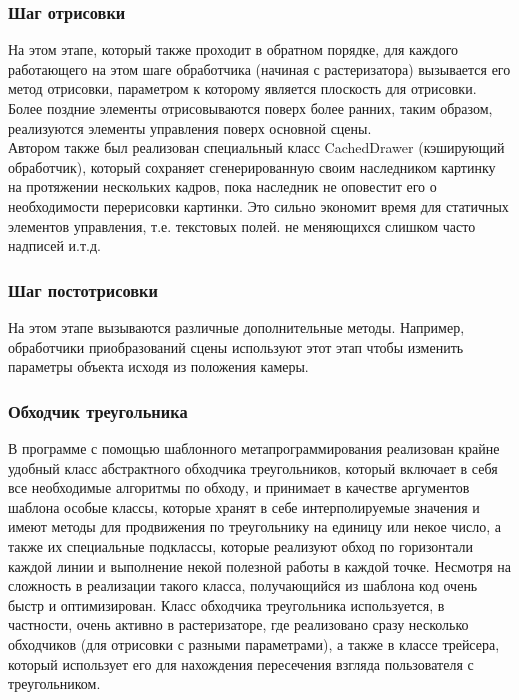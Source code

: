 \documentclass[a4paper,12pt]{report}
\numberwithin{equation}{section}
\begin{document}
\subsubsection{Шаг отрисовки}
На этом этапе, который также проходит в обратном порядке, для каждого работающего на этом шаге обработчика (начиная с растеризатора) вызывается его метод отрисовки, параметром к которому является плоскость для отрисовки. Более поздние элементы отрисовываются поверх более ранних, таким образом, реализуются элементы управления поверх основной сцены. \\
Автором также был реализован специальный класс CachedDrawer (кэширующий обработчик), который сохраняет сгенерированную своим наследником картинку на протяжении нескольких кадров, пока наследник не оповестит его о необходимости перерисовки картинки. Это сильно экономит время для статичных элементов управления, т.е. текстовых полей. не меняющихся слишком часто надписей и.т.д.

\subsubsection{Шаг постотрисовки}
На этом этапе вызываются различные дополнительные методы. Например, обработчики приобразований сцены используют этот этап чтобы изменить параметры объекта исходя из положения камеры.

\subsubsection{Обходчик треугольника} \label{triangle_traverse_struct_section}
В программе с помощью шаблонного метапрограммирования реализован крайне удобный класс абстрактного обходчика треугольников, который включает в себя все необходимые алгоритмы по обходу, и принимает в качестве аргументов шаблона особые классы, которые хранят в себе интерполируемые значения и имеют методы для продвижения по треугольнику на единицу или некое число, а также их специальные подклассы, которые реализуют обход по горизонтали каждой линии и выполнение некой полезной работы в каждой точке. Несмотря на сложность в реализации такого класса, получающийся из шаблона код очень быстр и оптимизирован. Класс обходчика треугольника используется, в частности, очень активно в растеризаторе, где реализовано сразу несколько обходчиков (для отрисовки с разными параметрами), а также в классе трейсера, который использует его для нахождения пересечения взгляда пользователя с треугольником.
\end{document}
